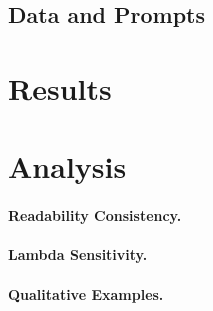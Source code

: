 \documentclass[11pt]{article}
\begin{document}
\subsection{Data and Prompts}
\label{sec:experiments:data}


\section{Results}
\label{sec:results}




\section{Analysis}
\label{sec:analysis}


\paragraph{Readability Consistency.}

\paragraph{Lambda Sensitivity.}

\paragraph{Qualitative Examples.}
\end{document}
